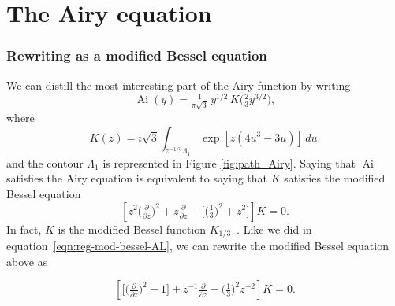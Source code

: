 \documentclass{article}
\theoremstyle{definition}
\DeclareMathOperator{\Ai}{Ai}
\theoremstyle{plain}
\begin{document}
\appendix

\section{The Airy equation}\label{airy-appendix}

\subsubsection{Rewriting as a modified Bessel equation}
We can distill the most interesting part of the Airy function by writing
\[ \Ai(y) = \tfrac{1}{\pi\sqrt{3}}\,y^{1/2}\,K\big(\tfrac{2}{3} y^{3/2}\big), \]
where
\begin{equation}\label{integral:mod-bessel}
K(z) = i\sqrt{3} \int_{z^{-1/3}\Lambda_1} \exp\left[z \left(4u^3 - 3u\right)\right]\,du.
\end{equation}
and the contour $\Lambda_1$ is represented in Figure \ref{fig:path_Airy}.
Saying that $\Ai$ satisfies the Airy equation is equivalent to saying that $K$ satisfies the modified Bessel equation
\begin{equation}\label{eqn:mod-bessel-1/3}
\left[z^2 \big(\tfrac{\partial}{\partial z}\big)^2 + z \tfrac{\partial}{\partial z} - \big[\big(\tfrac{1}{3}\big)^2 + z^2\big]\right] K = 0.
\end{equation}
In fact, $K$ is the modified Bessel function $K_{1/3}$~\cite[equation~9.6.1]{dlmf}.
Like we did in equation~\eqref{eqn:reg-mod-bessel-AL}, we can rewrite the modified Bessel equation above as 

\begin{equation}\label{eqn:reg-mod-bessel}
\left[ \big[ \big(\tfrac{\partial}{\partial z}\big)^2 - 1 \big] + z^{-1} \tfrac{\partial}{\partial z} - \big(\tfrac{1}{3}\big)^2 z^{-2} \right] K = 0.
\end{equation}
\end{document}
